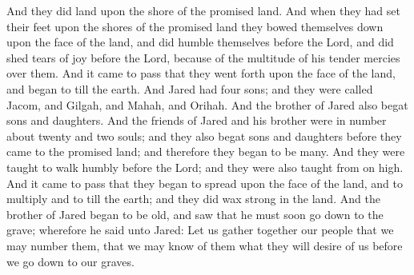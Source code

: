 And they did land upon the shore of the promised land. And when they had set their feet upon the shores of the promised land they bowed themselves down upon the face of the land, and did humble themselves before the Lord, and did shed tears of joy before the Lord, because of the multitude of his tender mercies over them.
\bverse \iffalse And it came to pass that they went forth upon the face of the land, and began to till the earth. \fi
And it came to pass that they went forth upon the face of the land, and began to till the earth.
\bverse \iffalse And Jared had four sons; and they were called Jacom, and Gilgah, and Mahah, and Orihah. \fi
And Jared had four sons; and they were called Jacom, and Gilgah, and Mahah, and Orihah.
\bverse \iffalse And the brother of Jared also begat sons and daughters. \fi
And the brother of Jared also begat sons and daughters.
\bverse \iffalse And the friends of Jared and his brother were in number about twenty and two souls; and they also begat sons and daughters before they came to the promised land; and therefore they began to be many. \fi
And the friends of Jared and his brother were in number about twenty and two souls; and they also begat sons and daughters before they came to the promised land; and therefore they began to be many.
\bverse \iffalse And they were taught to walk humbly before the Lord; and they were also taught from on high. \fi
And they were taught to walk humbly before the Lord; and they were also taught from on high.
\bverse \iffalse And it came to pass that they began to spread upon the face of the land, and to multiply and to till the earth; and they did wax strong in the land. \fi
And it came to pass that they began to spread upon the face of the land, and to multiply and to till the earth; and they did wax strong in the land.
\bverse \iffalse And the brother of Jared began to be old, and saw that he must soon go down to the grave; wherefore he said unto Jared: Let us gather together our people that we may number them, that we may know of them what they will desire of us before we go down to our graves. \fi
And the brother of Jared began to be old, and saw that he must soon go down to the grave; wherefore he said unto Jared: Let us gather together our people that we may number them, that we may know of them what they will desire of us before we go down to our graves.
\bverse \iffalse And accordingly the people were gathered together. Now the number of the sons and the daughters of the brother of Jared were twenty and two souls; and the number of sons and daughters of Jared were twelve, he having four sons. \fi

